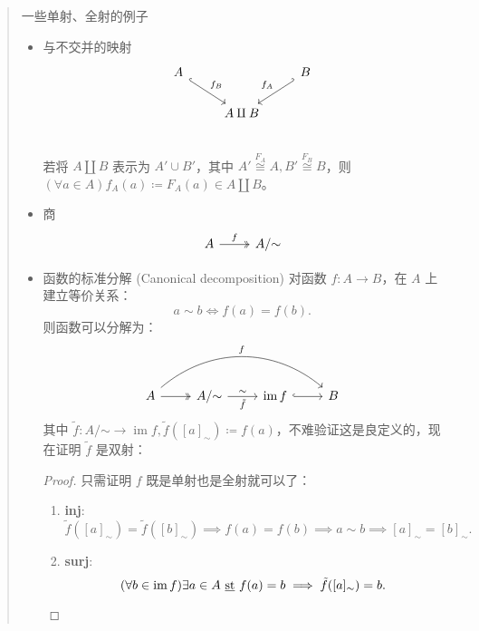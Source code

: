 \begin{quote}{一些单射、全射的例子}
\begin{itemize}
        \item 与不交并的映射
              \[
                  \begin{tikzcd}
                      A\arrow[rd, "f_B",hook] & {}         & B\arrow[ld, "f_A"', hook'] \\
                      {}                      & A\amalg  B & {}                         \\
                  \end{tikzcd}
              \]
              若将 \(A\amalg B\) 表示为 \(A'\cup B'\)，其中 \(A'\overset{F_A}{\cong} A, B'\overset{F_B}\cong B\)，则 \((\forall a\in A)f_A(a) \coloneqq F_A(a) \in A\amalg B\)。
        \item 商
              \[
                  \begin{tikzcd}
                      A\arrow[r, "f", two heads] & A /\mathord \sim
                  \end{tikzcd}
              \]
        \item 函数的标准分解 (Canonical decomposition)
              对函数 \(f:A\to B\)，在 \(A\) 上建立等价关系：
              \[
                  a\sim b \iff f(a) = f(b)
                  .\]
              则函数可以分解为：
              \[
                  \begin{tikzcd}
                      A\arrow[r, two heads]\arrow[rrr, bend left = 40, "f"] & A /\mathord \sim \arrow[r, "\sim", "\tilde f"'] & \operatorname{im}f\arrow[r, hook] & B
                  \end{tikzcd}
              \]
              其中 \(\tilde f:A / \mathord\sim \to \operatorname{im} f, \tilde f([a]_{\sim}) \coloneqq f(a)  \)，不难验证这是良定义的，现在证明 \(\tilde f\) 是双射：
              \begin{proof}{}
                  只需证明 \(f\) 既是单射也是全射就可以了：
                  \begin{enumerate}
                      \item \textbf{inj}:
                            \[
                                \tilde f\left( [a]_{\sim} \right)  = \tilde f\left( [b]_{\sim} \right) \implies f(a) = f(b) \implies a\sim b \implies [a]_{\sim} = [b]_{\sim}
                                .\]
                      \item \textbf{surj}:
                            \[
                                (\forall b\in \operatorname{im}f)\exists a\in A \text{ \underline{st} }f(a) = b \implies \tilde f\left( [a]_{\sim} \right) = b
                                .\]
                  \end{enumerate}
              \end{proof}
    \end{itemize}
\end{quote}


